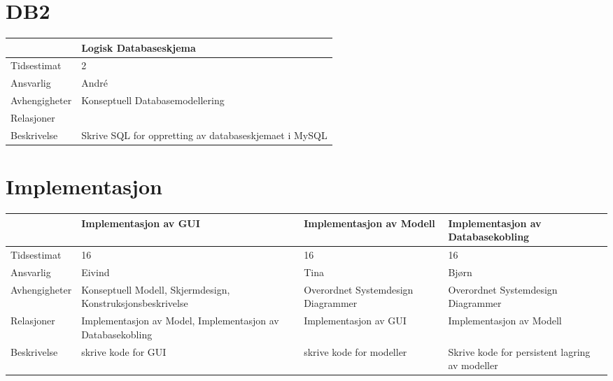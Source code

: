 \documentclass{article}
\begin{document}
\section{DB2}

\begin{tabular}{|l|p{3cm}|}
\hline
& Logisk Databaseskjema \\ \hline
Tidsestimat & 2 \\ \hline
Ansvarlig & Andr\'{e} \\ \hline
Avhengigheter & Konseptuell Databasemodellering \\ \hline
Relasjoner &  \\ \hline
Beskrivelse & Skrive SQL for oppretting av databaseskjemaet i MySQL \\ \hline
\end{tabular}

\bigskip

\section{Implementasjon}

\begin{tabular}{|l|p{3cm}|p{3cm}|p{3cm}|}
\hline
& Implementasjon av GUI & Implementasjon av Modell & Implementasjon av
Databasekobling \\ \hline
Tidsestimat & 16 & 16 & 16 \\ \hline
Ansvarlig & Eivind & Tina & Bj\o rn \\ \hline
Avhengigheter & Konseptuell Modell, Skjermdesign, Konstruksjonsbeskrivelse & 
Overordnet Systemdesign Diagrammer & Overordnet Systemdesign Diagrammer \\ 
\hline
Relasjoner & Implementasjon av Model, Implementasjon av Databasekobling & 
Implementasjon av GUI & Implementasjon av Modell \\ \hline
Beskrivelse & skrive kode for GUI & skrive kode for modeller & Skrive kode
for persistent lagring av modeller \\ \hline
\end{tabular}
\end{document}
